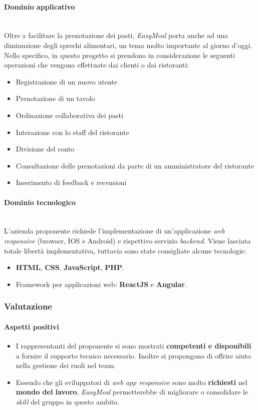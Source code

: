 \documentclass[italian,12pt]{article} %
\begin{document}
\paragraph{Dominio applicativo}\mbox{}\\
Oltre a facilitare la prenotazione dei pasti, \textit{EasyMeal} porta anche ad una diminuzione degli sprechi alimentari, un tema molto importante al giorno d'oggi. \\
Nello specifico, in questo progetto si prendono in considerazione le seguenti operazioni che vengono effettuate dai clienti o dai ristoranti:
\begin{itemize}\itemsep0em
	\item Registrazione di un nuovo utente
	\item Prenotazione di un tavolo
	\item Ordinazione collaborativa dei pasti
	\item Interazione con lo staff del ristorante
	\item Divisione del conto
	\item Consultazione delle prenotazioni da parte di un amministratore del ristorante
	\item Inserimento di feedback e recensioni
\end{itemize}
\paragraph{Dominio tecnologico}\mbox{}\\
L'azienda proponente richiede l'implementazione di un'applicazione \textit{web responsive} (browser, IOS e Android) e rispettivo servizio \textit{backend}.
Viene lasciata totale libertà implementativa, tuttavia sono state consigliate alcune tecnologie:
\begin{itemize}
	\item \textbf{HTML}, \textbf{CSS}, \textbf{JavaScript}, \textbf{PHP}.
	\item Framework per applicazioni web: \textbf{ReactJS} e \textbf{Angular}.
\end{itemize}

\subsubsection{Valutazione}
\paragraph{Aspetti positivi}
\begin{itemize}
	\item I rappresentanti del proponente si sono mostrati \textbf{competenti e disponibili} a fornire il supporto tecnico necessario.
	      Inoltre si propongono di offrire aiuto nella gestione dei ruoli nel team.
	\item Essendo che gli sviluppatori di \textit{web app responsive} sono molto \textbf{richiesti} nel \textbf{mondo del lavoro}, \textit{EasyMeal} permetterebbe
	      di migliorare o consolidare le \textit{skill} del gruppo in questo ambito.
\end{itemize}
\end{document}
